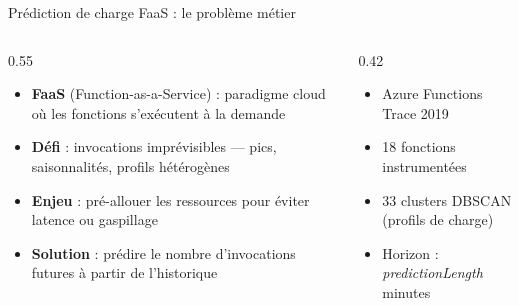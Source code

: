 \documentclass[10pt]{beamer}
\begin{document}
\begin{frame}{Prédiction de charge FaaS : le problème métier}
  \begin{columns}
    \begin{column}{0.55\textwidth}
      \begin{itemize}
        \item \textbf{FaaS} (Function-as-a-Service) : paradigme cloud où les fonctions
              s'exécutent à la demande
        \item \textbf{Défi} : invocations imprévisibles —
              pics, saisonnalités, profils hétérogènes
        \item \textbf{Enjeu} : pré-allouer les ressources pour éviter latence ou gaspillage
        \item \textbf{Solution} : prédire le nombre d'invocations futures
              à partir de l'historique
      \end{itemize}
    \end{column}
    \begin{column}{0.42\textwidth}
      \begin{tcolorbox}[title=Dataset FAYAM, colback=blue!5, colframe=blue!50!black,
                        arc=3mm, fonttitle=\bfseries]
        \begin{itemize}
          \item Azure Functions Trace 2019
          \item 18 fonctions instrumentées
          \item 33 clusters DBSCAN (profils de charge)
          \item Horizon : \textit{predictionLength} minutes
        \end{itemize}
      \end{tcolorbox}
    \end{column}
  \end{columns}
\end{frame}
\end{document}
